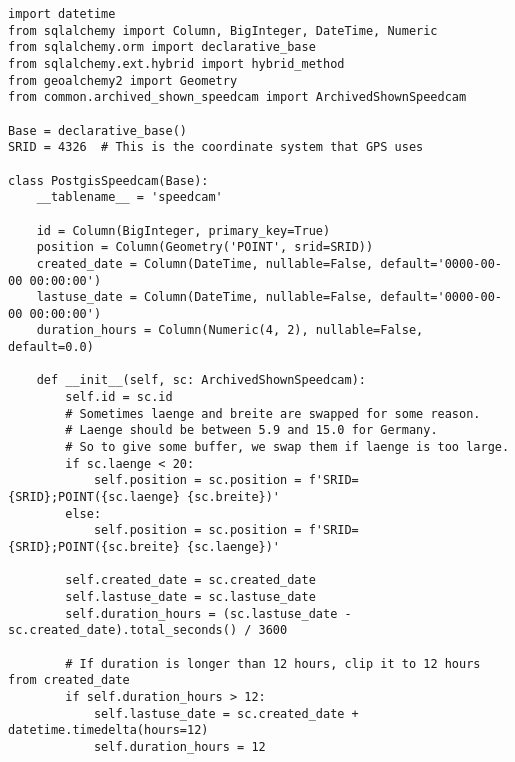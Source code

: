 \begin{code}
\begin{verbatim}
import datetime
from sqlalchemy import Column, BigInteger, DateTime, Numeric
from sqlalchemy.orm import declarative_base
from sqlalchemy.ext.hybrid import hybrid_method
from geoalchemy2 import Geometry
from common.archived_shown_speedcam import ArchivedShownSpeedcam

Base = declarative_base()
SRID = 4326  # This is the coordinate system that GPS uses

class PostgisSpeedcam(Base):
    __tablename__ = 'speedcam'

    id = Column(BigInteger, primary_key=True)
    position = Column(Geometry('POINT', srid=SRID))
    created_date = Column(DateTime, nullable=False, default='0000-00-00 00:00:00')
    lastuse_date = Column(DateTime, nullable=False, default='0000-00-00 00:00:00')
    duration_hours = Column(Numeric(4, 2), nullable=False, default=0.0)

    def __init__(self, sc: ArchivedShownSpeedcam):
        self.id = sc.id
        # Sometimes laenge and breite are swapped for some reason.
        # Laenge should be between 5.9 and 15.0 for Germany.
        # So to give some buffer, we swap them if laenge is too large.
        if sc.laenge < 20:
            self.position = sc.position = f'SRID={SRID};POINT({sc.laenge} {sc.breite})'
        else:
            self.position = sc.position = f'SRID={SRID};POINT({sc.breite} {sc.laenge})'

        self.created_date = sc.created_date
        self.lastuse_date = sc.lastuse_date
        self.duration_hours = (sc.lastuse_date - sc.created_date).total_seconds() / 3600

        # If duration is longer than 12 hours, clip it to 12 hours from created_date
        if self.duration_hours > 12:
            self.lastuse_date = sc.created_date + datetime.timedelta(hours=12)
            self.duration_hours = 12
\end{verbatim}
\label{lst:SQLAlchemyModelPostGIS}
\end{code}

\clearpage

